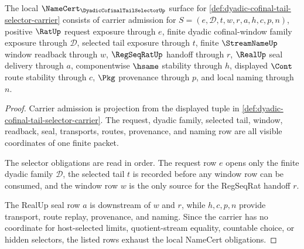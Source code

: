 \begin{theorem}
\label{thm:dyadic-cofinal-tail-selector-namecert-obligations}
The local $\NameCert_{\DyadicCofinalTailSelectorUp}$ surface for \autoref{def:dyadic-cofinal-tail-selector-carrier} consists of carrier admission for $S=(e,\mathcal{D},t,w,r,a,h,c,p,n)$, positive $\RatUp$ request exposure through $e$, finite dyadic cofinal-window family exposure through $\mathcal{D}$, selected tail exposure through $t$, finite $\StreamNameUp$ window readback through $w$, $\RegSeqRatUp$ handoff through $r$, $\RealUp$ seal delivery through $a$, componentwise $\hsame$ stability through $h$, displayed $\Cont$ route stability through $c$, $\Pkg$ provenance through $p$, and local naming through $n$.
\end{theorem}
\begin{proof}
Carrier admission is projection from the displayed tuple in \autoref{def:dyadic-cofinal-tail-selector-carrier}. The request, dyadic family, selected tail, window, readback, seal, transports, routes, provenance, and naming row are all visible coordinates of one finite packet.

The selector obligations are read in order. The request row $e$ opens only the finite dyadic family $\mathcal{D}$, the selected tail $t$ is recorded before any window row can be consumed, and the window row $w$ is the only source for the RegSeqRat handoff $r$.

The RealUp seal row $a$ is downstream of $w$ and $r$, while $h,c,p,n$ provide transport, route replay, provenance, and naming. Since the carrier has no coordinate for host-selected limits, quotient-stream equality, countable choice, or hidden selectors, the listed rows exhaust the local NameCert obligations.
\end{proof}

